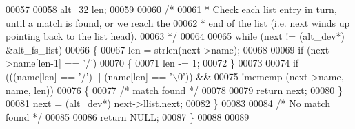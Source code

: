 \begin{DoxyCode}
00057 
00058   alt_32 len;
00059  
00060   \textcolor{comment}{/*}
00061 \textcolor{comment}{   * Check each list entry in turn, until a match is found, or we reach the}
00062 \textcolor{comment}{   * end of the list (i.e. next winds up pointing back to the list head).}
00063 \textcolor{comment}{   */} 
00064  
00065   while (next != (alt_dev*) &alt_fs_list)
00066   \{
00067     len = strlen(next->name);
00068     
00069     \textcolor{keywordflow}{if} (next->name[len-1] == \textcolor{charliteral}{'/'})
00070     \{
00071       len -= 1;
00072     \}
00073 
00074     \textcolor{keywordflow}{if} (((name[len] == \textcolor{charliteral}{'/'}) || (name[len] == \textcolor{charliteral}{'\(\backslash\)0'})) && 
00075         !memcmp (next->name, name, len))
00076     \{
00077       \textcolor{comment}{/* match found */}
00078 
00079       \textcolor{keywordflow}{return} next;
00080     \}
00081     next = (alt_dev*) next->llist.next;
00082   \}
00083   
00084   \textcolor{comment}{/* No match found */}
00085   
00086   \textcolor{keywordflow}{return} NULL;     
00087 \}
00088 
00089 
\end{DoxyCode}
